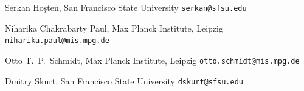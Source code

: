 \documentclass[12pt]{article}
\theoremstyle{definition}
\numberwithin{theorem}{section}
\begin{document}
 








\smallskip
\small 



\noindent Serkan Hoşten,
San Francisco State University
\hfill {\tt serkan@sfsu.edu}

\noindent Niharika Chakrabarty Paul, Max Planck Institute, Leipzig 
\hfill {\tt niharika.paul@mis.mpg.de}

\noindent Otto T.~P.~Schmidt, 
Max Planck Institute, Leipzig
\hfill {\tt otto.schmidt@mis.mpg.de}

\noindent Dmitry Skurt,
San Francisco State University
\hfill {\tt dskurt@sfsu.edu}
\end{document}
